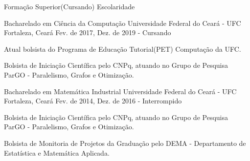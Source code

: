 

\begin{cventries}

  \cventry
    {Formação Superior(Cursando)} %
    {Escolaridade} %
    {} %
    {} %
    {
      \begin{cvitems} %
      \end{cvitems}
    }
  \cventry
    {Bacharelado em Ciência da Computação} %
    {Universidade Federal do Ceará - UFC} %
    {Fortaleza, Ceará} %
    {Fev. de 2017, Dez. de 2019 - Cursando} %
    {
      \begin{cvitems} %
        \item {Atual bolsista do Programa de Educação Tutorial(PET) Computação da UFC.}
        \item {Bolsista de Iniciação Científica pelo CNPq, atuando no Grupo de Pesquisa ParGO - Paralelismo, Grafos e Otimização.}        
      \end{cvitems}
    }

\vskip 0.4cm
  \cventry
    {Bacharelado em Matemática Industrial} %
    {Universidade Federal do Ceará - UFC} %
    {Fortaleza, Ceará} %
    {Fev. de 2014, Dez. de 2016 - Interrompido} %
    {
      \begin{cvitems} %
        \item {Bolsista de Iniciação Científica pelo CNPq, atuando no Grupo de Pesquisa ParGO - Paralelismo, Grafos e Otimização.}
        \item {Bolsista de Monitoria de Projetos da Graduação pelo DEMA - Departamento de Estatística e Matemática Aplicada.}        
      \end{cvitems}
    }       


\end{cventries}
